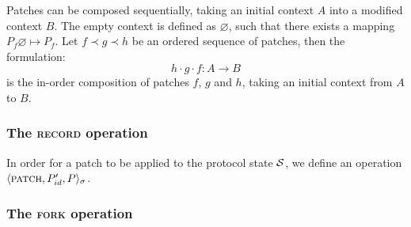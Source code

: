 Patches can be composed sequentially, taking an initial context $A$ into
a modified context $B$. The empty context is defined as $\varnothing$, such
that there exists a mapping $P_f \varnothing \mapsto P_f$. Let $f \prec g
\prec h$ be an ordered sequence of patches, then the formulation:
\[
    h \cdot g \cdot f : A \to B
\]
is the in-order composition of patches $f$, $g$ and $h$, taking an initial
context from $A$ to $B$.







\subsubsection{The \textsc{record} operation}
\label{record-op}

In order for a patch to be applied to the protocol state $\mathcal{S}$, we define
an operation $\langle \text{\normalfont\scshape patch}, P'_{id}, P \rangle_{\sigma}$.

\subsubsection{The \textsc{fork} operation}
\label{fork-op}




